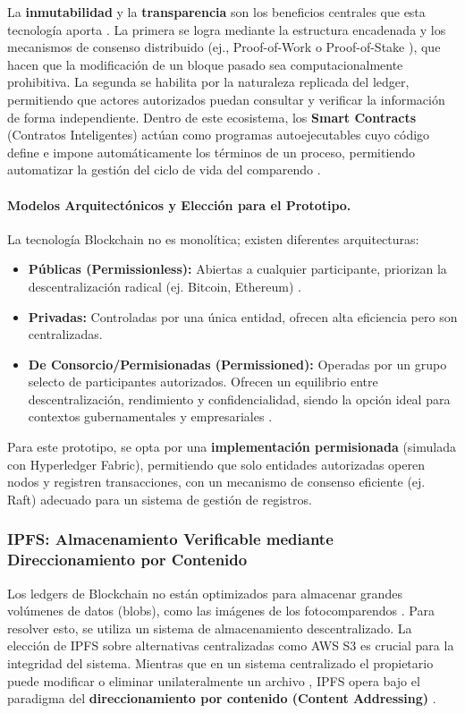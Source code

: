 La \textbf{inmutabilidad} y la \textbf{transparencia} son los beneficios centrales que esta tecnología aporta \parencite{swan2015blockchain,antonopoulos2023mastering}. La primera se logra mediante la estructura encadenada y los mecanismos de consenso distribuido (ej., Proof-of-Work \parencite{nakamoto2008bitcoin} o Proof-of-Stake \parencite{king2012ppcoin}), que hacen que la modificación de un bloque pasado sea computacionalmente prohibitiva. La segunda se habilita por la naturaleza replicada del ledger, permitiendo que actores autorizados puedan consultar y verificar la información de forma independiente. Dentro de este ecosistema, los \textbf{Smart Contracts} (Contratos Inteligentes) actúan como programas autoejecutables cuyo código define e impone automáticamente los términos de un proceso, permitiendo automatizar la gestión del ciclo de vida del comparendo \parencite{szabo1997smart, wood2014ethereum, buterin2014next}.

\paragraph{Modelos Arquitectónicos y Elección para el Prototipo.}
La tecnología Blockchain no es monolítica; existen diferentes arquitecturas:
\begin{itemize}
    \item \textbf{Públicas (Permissionless):} Abiertas a cualquier participante, priorizan la descentralización radical (ej. Bitcoin, Ethereum) \parencite{nakamoto2008bitcoin}.
    \item \textbf{Privadas:} Controladas por una única entidad, ofrecen alta eficiencia pero son centralizadas.
    \item \textbf{De Consorcio/Permisionadas (Permissioned):} Operadas por un grupo selecto de participantes autorizados. Ofrecen un equilibrio entre descentralización, rendimiento y confidencialidad, siendo la opción ideal para contextos gubernamentales y empresariales \parencite{vukolic2015quest,cachin2018architecture}.
\end{itemize}
Para este prototipo, se opta por una \textbf{implementación permisionada} (simulada con Hyperledger Fabric), permitiendo que solo entidades autorizadas operen nodos y registren transacciones, con un mecanismo de consenso eficiente (ej. Raft) adecuado para un sistema de gestión de registros.

\subsubsection{IPFS: Almacenamiento Verificable mediante Direccionamiento por Contenido}
Los ledgers de Blockchain no están optimizados para almacenar grandes volúmenes de datos (blobs), como las imágenes de los fotocomparendos \parencite{xu2019taxonomy}. Para resolver esto, se utiliza un sistema de almacenamiento descentralizado. La elección de IPFS sobre alternativas centralizadas como AWS S3 es crucial para la integridad del sistema. Mientras que en un sistema centralizado el propietario puede modificar o eliminar unilateralmente un archivo \parencite{vogels2008eventually}, IPFS opera bajo el paradigma del \textbf{direccionamiento por contenido (Content Addressing)} \parencite{benet2014ipfs, voigt2017gdpr}.

